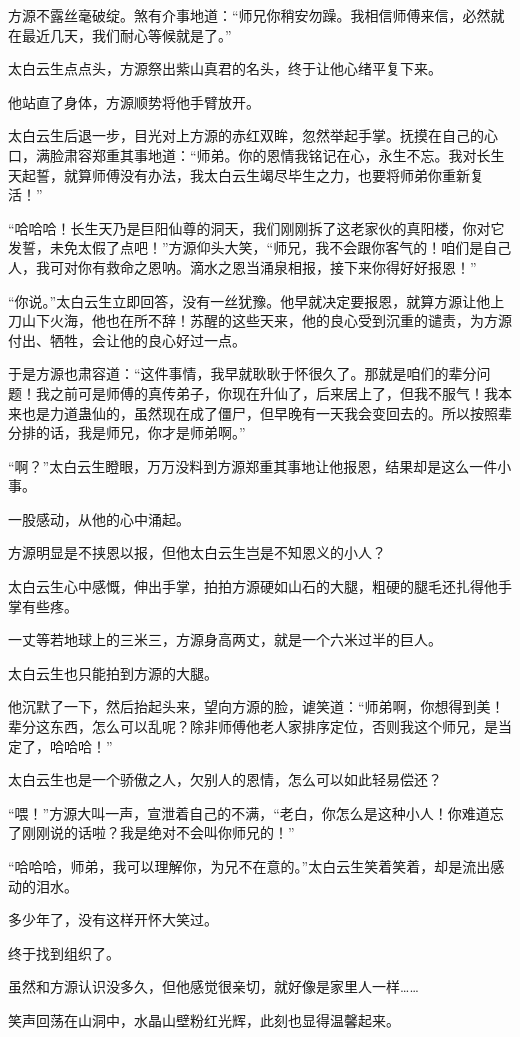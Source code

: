 \begin{this_body}
方源不露丝毫破绽。煞有介事地道：“师兄你稍安勿躁。我相信师傅来信，必然就在最近几天，我们耐心等候就是了。”

太白云生点点头，方源祭出紫山真君的名头，终于让他心绪平复下来。

他站直了身体，方源顺势将他手臂放开。

太白云生后退一步，目光对上方源的赤红双眸，忽然举起手掌。抚摸在自己的心口，满脸肃容郑重其事地道：“师弟。你的恩情我铭记在心，永生不忘。我对长生天起誓，就算师傅没有办法，我太白云生竭尽毕生之力，也要将师弟你重新复活！”

“哈哈哈！长生天乃是巨阳仙尊的洞天，我们刚刚拆了这老家伙的真阳楼，你对它发誓，未免太假了点吧！”方源仰头大笑，“师兄，我不会跟你客气的！咱们是自己人，我可对你有救命之恩呐。滴水之恩当涌泉相报，接下来你得好好报恩！”

“你说。”太白云生立即回答，没有一丝犹豫。他早就决定要报恩，就算方源让他上刀山下火海，他也在所不辞！苏醒的这些天来，他的良心受到沉重的谴责，为方源付出、牺牲，会让他的良心好过一点。

于是方源也肃容道：“这件事情，我早就耿耿于怀很久了。那就是咱们的辈分问题！我之前可是师傅的真传弟子，你现在升仙了，后来居上了，但我不服气！我本来也是力道蛊仙的，虽然现在成了僵尸，但早晚有一天我会变回去的。所以按照辈分排的话，我是师兄，你才是师弟啊。”

“啊？”太白云生瞪眼，万万没料到方源郑重其事地让他报恩，结果却是这么一件小事。

一股感动，从他的心中涌起。

方源明显是不挟恩以报，但他太白云生岂是不知恩义的小人？

太白云生心中感慨，伸出手掌，拍拍方源硬如山石的大腿，粗硬的腿毛还扎得他手掌有些疼。

一丈等若地球上的三米三，方源身高两丈，就是一个六米过半的巨人。

太白云生也只能拍到方源的大腿。

他沉默了一下，然后抬起头来，望向方源的脸，谑笑道：“师弟啊，你想得到美！辈分这东西，怎么可以乱呢？除非师傅他老人家排序定位，否则我这个师兄，是当定了，哈哈哈！”

太白云生也是一个骄傲之人，欠别人的恩情，怎么可以如此轻易偿还？

“喂！”方源大叫一声，宣泄着自己的不满，“老白，你怎么是这种小人！你难道忘了刚刚说的话啦？我是绝对不会叫你师兄的！”

“哈哈哈，师弟，我可以理解你，为兄不在意的。”太白云生笑着笑着，却是流出感动的泪水。

多少年了，没有这样开怀大笑过。

终于找到组织了。

虽然和方源认识没多久，但他感觉很亲切，就好像是家里人一样……

笑声回荡在山洞中，水晶山壁粉红光辉，此刻也显得温馨起来。

\end{this_body}

